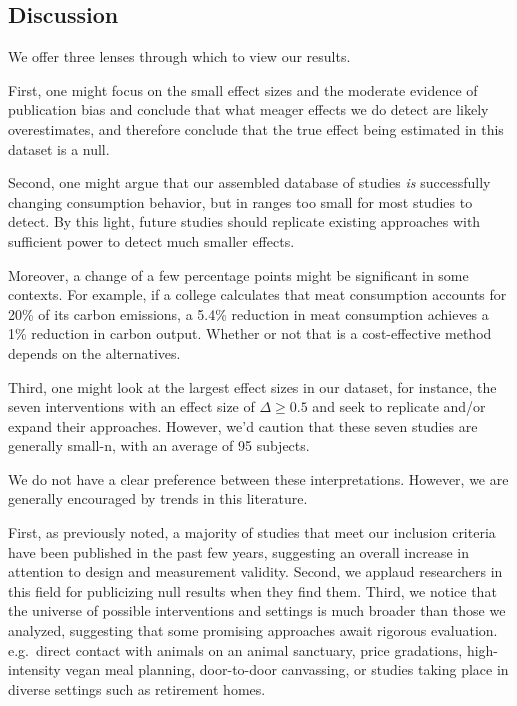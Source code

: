 \documentclass[sn-nature,pdflatex]{sn-jnl}
\begin{document}
\subsection{Discussion}\label{discussion}

We offer three lenses through which to view our results.

First, one might focus on the small effect sizes and the moderate
evidence of publication bias and conclude that what meager effects we do
detect are likely overestimates, and therefore conclude that the true
effect being estimated in this dataset is a null.

Second, one might argue that our assembled database of studies \emph{is}
successfully changing consumption behavior, but in ranges too small for
most studies to detect. By this light, future studies should replicate
existing approaches with sufficient power to detect much smaller
effects.

Moreover, a change of a few percentage points might be significant in
some contexts. For example, if a college calculates that meat
consumption accounts for 20\% of its carbon emissions, a 5.4\% reduction
in meat consumption \citep{jalil2023} achieves a 1\% reduction in carbon
output. Whether or not that is a cost-effective method depends on the
alternatives.

Third, one might look at the largest effect sizes in our dataset, for
instance, the seven interventions with an effect size of
\(\Delta \geq 0.5\)
\citep{bianchi2022, carfora2023, merrill2009, piester2020} and seek to
replicate and/or expand their approaches. However, we'd caution that
these seven studies are generally small-n, with an average of 95
subjects.

We do not have a clear preference between these interpretations.
However, we are generally encouraged by trends in this literature.

First, as previously noted, a majority of studies that meet our
inclusion criteria have been published in the past few years, suggesting
an overall increase in attention to design and measurement validity.
Second, we applaud researchers in this field for publicizing null
results when they find them. Third, we notice that the universe of
possible interventions and settings is much broader than those we
analyzed, suggesting that some promising approaches await rigorous
evaluation. e.g.~direct contact with animals on an animal sanctuary,
price gradations, high-intensity vegan meal planning, door-to-door
canvassing, or studies taking place in diverse settings such as
retirement homes.
\end{document}
